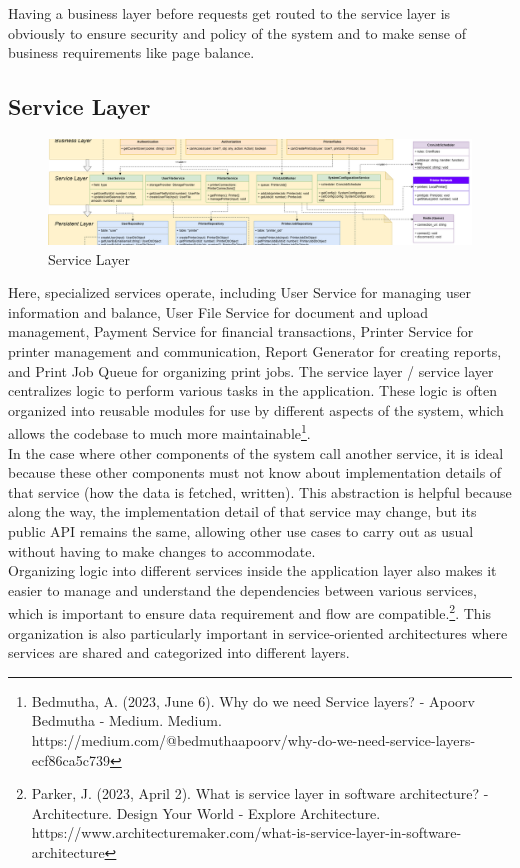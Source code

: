 Having a business layer before requests get routed to the service layer is obviously to ensure security and policy of the system and to make sense of business requirements like page balance.

\subsection{Service Layer}

\begin{figure}[H]
  \includegraphics[max width=0.9\linewidth]{chapters/6. architecture-design/Layered Architecture/3. Service Layer.png}
  \caption{Service Layer}%
\end{figure}

Here, specialized services operate, including User Service for managing user information and balance, User File Service  for document and upload management, Payment Service for financial transactions, Printer Service for printer management and communication, Report Generator for creating reports, and Print Job Queue for organizing print jobs. The service layer / service layer centralizes logic to perform various tasks in the application. These logic is often organized into reusable modules for use by different aspects of the system, which allows the codebase to much more maintainable\footnote{Bedmutha, A. (2023, June 6). Why do we need Service layers? - Apoorv Bedmutha - Medium. Medium. https://medium.com/@bedmuthaapoorv/why-do-we-need-service-layers-ecf86ca5c739}.\\

In the case where other components of the system call another service, it is ideal because these other components must not know about implementation details of that service (how the data is fetched, written). This abstraction is helpful because along the way, the implementation detail of that service may change, but its public API remains the same, allowing other use cases to carry out as usual without having to make changes to accommodate.\\

Organizing logic into different services inside the application layer also makes it easier to manage and understand the dependencies between various services, which is important to ensure data requirement and flow are compatible.\footnote{ Parker, J. (2023, April 2). What is service layer in software architecture? - Architecture. Design Your World - Explore Architecture. https://www.architecturemaker.com/what-is-service-layer-in-software-architecture}. This organization is also particularly important in service-oriented architectures where services are shared and categorized into different layers.

